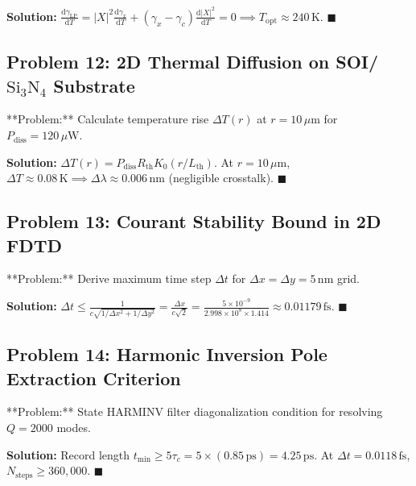 \documentclass[11pt,oneside]{article}
\begin{document}
\textbf{Solution:}
$\frac{\mathrm{d}\gamma_{\text{LP}}}{\mathrm{d}T} = |X|^2 \frac{\mathrm{d}\gamma_x}{\mathrm{d}T} + (\gamma_x - \gamma_c)\frac{\mathrm{d}|X|^2}{\mathrm{d}T} = 0 \implies T_{\text{opt}} \approx 240\,\text{K}$. $\blacksquare$



\subsection{Problem 12: 2D Thermal Diffusion on SOI/$\text{Si}_3\text{N}_4$ Substrate}
\begin{problembox}
**Problem:** Calculate temperature rise $\Delta T(r)$ at $r = 10\,\mu\text{m}$ for $P_{\text{diss}} = 120\,\mu\text{W}$.
\end{problembox}

\textbf{Solution:}
$\Delta T(r) = P_{\text{diss}} R_{\text{th}} K_0(r / L_{\text{th}})$. At $r = 10\,\mu\text{m}$, $\Delta T \approx 0.08\,\text{K} \implies \Delta \lambda \approx 0.006\,\text{nm}$ (negligible crosstalk). $\blacksquare$



\subsection{Problem 13: Courant Stability Bound in 2D FDTD}
\begin{problembox}
**Problem:** Derive maximum time step $\Delta t$ for $\Delta x = \Delta y = 5\,\text{nm}$ grid.
\end{problembox}

\textbf{Solution:}
$\Delta t \le \frac{1}{c \sqrt{1/\Delta x^2 + 1/\Delta y^2}} = \frac{\Delta x}{c \sqrt{2}} = \frac{5 \times 10^{-9}}{2.998 \times 10^8 \times 1.414} \approx 0.01179\,\text{fs}$. $\blacksquare$



\subsection{Problem 14: Harmonic Inversion Pole Extraction Criterion}
\begin{problembox}
**Problem:** State HARMINV filter diagonalization condition for resolving $Q = 2000$ modes.
\end{problembox}

\textbf{Solution:}
Record length $t_{\text{min}} \ge 5 \tau_c = 5 \times (0.85\,\text{ps}) = 4.25\,\text{ps}$. At $\Delta t = 0.0118\,\text{fs}$, $N_{\text{steps}} \ge 360{,}000$. $\blacksquare$
\end{document}
